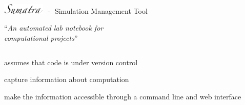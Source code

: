 \documentclass[xcolor=svgnames,11pt]{beamer}
\begin{document}
\begin{frame}{\includegraphics[width=2.0cm]{sumatra_logo_up.png}
     \textcolor{white}{-}- \textcolor{white}{-}Simulation Management
     Tool}

   \large
   \vspace{0.3cm}
   \begin{center}
     \enquote{\textit{An automated lab notebook for\\ computational projects}}
   \end{center}

   \vspace{-0.15cm}
   \begin{center}
   \end{center}

   \vspace{0.2cm}
   \begin{columns}
     \begin{column}{0.58\textwidth}
       \begin{arrowlist}
         \itemsep14pt
         \item<4-> assumes that code is under version control
         \item<5-> capture information about computation
         \item<6-> make the information accessible through a command line
           and web interface
       \end{arrowlist}
       \vspace{1cm}


\end{column}
\end{columns}
\end{frame}
\end{document}
